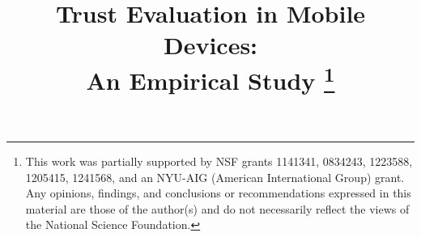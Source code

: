 \documentclass[conference]{IEEEtran}
\begin{document}
\title{Trust Evaluation in Mobile Devices: \\An Empirical Study
\thanks{This work was partially supported by NSF grants 1141341, 0834243, 
1223588, 1205415, 1241568, and an NYU-AIG (American International Group)
grant. Any opinions, findings, and conclusions or recommendations 
expressed in this material are those of the author(s) and do not 
necessarily reflect the views of the National Science Foundation.
}}
\end{document}
